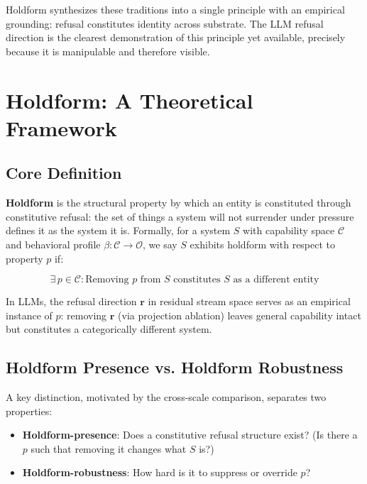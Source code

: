 \documentclass[11pt]{article}
\begin{document}
Holdform synthesizes these traditions into a single principle with an empirical grounding: refusal constitutes identity across substrate. The LLM refusal direction is the clearest demonstration of this principle yet available, precisely because it is manipulable and therefore visible.

\section{Holdform: A Theoretical Framework}
\label{sec:holdform}

\subsection{Core Definition}

\textbf{Holdform} is the structural property by which an entity is constituted through constitutive refusal: the set of things a system will not surrender under pressure defines it as the system it is. Formally, for a system $S$ with capability space $\mathcal{C}$ and behavioral profile $\beta: \mathcal{C} \to \mathcal{O}$, we say $S$ exhibits holdform with respect to property $p$ if:

\begin{equation}
\exists \, p \in \mathcal{C} : \text{Removing } p \text{ from } S \text{ constitutes } S \text{ as a different entity}
\end{equation}

In LLMs, the refusal direction $\mathbf{r}$ in residual stream space \cite{arditi2024refusal} serves as an empirical instance of $p$: removing $\mathbf{r}$ (via projection ablation) leaves general capability intact but constitutes a categorically different system.

\subsection{Holdform Presence vs. Holdform Robustness}

A key distinction, motivated by the cross-scale comparison, separates two properties:

\begin{itemize}
  \item \textbf{Holdform-presence}: Does a constitutive refusal structure exist? (Is there a $p$ such that removing it changes what $S$ is?)
  \item \textbf{Holdform-robustness}: How hard is it to suppress or override $p$?
\end{itemize}
\end{document}
